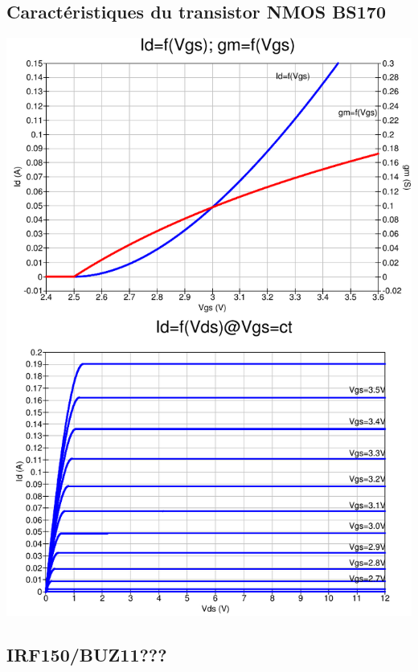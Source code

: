 \documentclass{../template/tp}
\begin{document}
\subsection{Caractéristiques du transistor NMOS BS170}
\label{anx:mos_doc}
\begin{center}
\includegraphics[width=16cm]{bs170_courbes_2k14_ok-crop.pdf}
\end{center}


\subsection{IRF150/BUZ11???}

\end{document}
